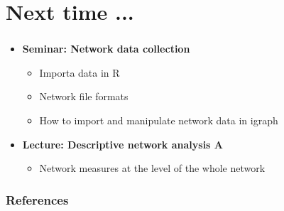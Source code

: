 \documentclass[8pt]{beamer}
\begin{document}
\section*{Next time ...}

\bgroup
{}
\begin{frame}[plain]{}
\begin{center}
\color{white}{\Huge\insertsection}
\end{center}
\end{frame}
\egroup


\begin{frame}
\frametitle{\insertsection}

\begin{itemize}
\item 	\textbf{Seminar: Network data collection}
	\begin{itemize}
	\item Importa data in R
	\item Network file formats 
	\item How to import and manipulate network data in igraph
	\end{itemize}	
	
\medskip
\medskip
\item 	\textbf{Lecture: Descriptive network analysis A}
	\begin{itemize}
	\item Network measures at the level of the whole network
	\end{itemize}		

\end{itemize}

\end{frame}







\bgroup
{}
\begin{frame}[plain]{}
\begin{center}
\color{white}{\Huge Questions}
\end{center}
\end{frame}
\egroup







\begin{frame}[allowframebreaks]
\frametitle{References}
\tiny


\end{frame}
\end{document}
